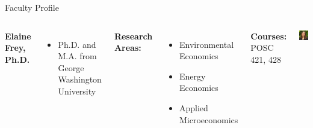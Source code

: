 \documentclass[10pt]{beamer}
\newlength{\imageheight}
\begin{document}
        \begin{frame}{Faculty Profile}
        \begin{columns}[t]
        \textbf{Elaine Frey, Ph.D.}
        \begin{itemize}
        \item Ph.D. and M.A. from George Washington University
        \end{itemize}
        
        \textbf{Research Areas:}
        \begin{itemize}
        \item Environmental Economics
        \item Energy Economics
        \item Applied Microeconomics
        \end{itemize}
        
        \textbf{Courses:} POSC 421, 428
        
        \vspace*{0.5cm}
        \includegraphics[height=\imageheight]{images/frey.jpg}
        \end{columns}
        \end{frame}
        
\end{document}
